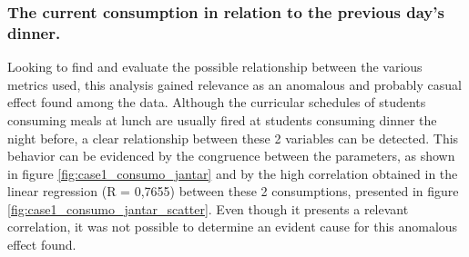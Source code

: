                 \subsubsection{The current consumption in relation to the previous day's dinner.}
                
                Looking to find and evaluate the possible relationship between the various metrics used, this analysis gained relevance as an anomalous and probably casual effect found among the data.
                Although the curricular schedules of students consuming meals at lunch are usually fired at students consuming dinner the night before, a clear relationship between these 2 variables can be detected.
                 This behavior can be evidenced by the congruence between the parameters, as shown in figure \ref{fig:case1_consumo_jantar} and by the high correlation obtained in the linear regression (R = 0,7655) between these 2 consumptions, presented in figure  \ref{fig:case1_consumo_jantar_scatter}. Even though it presents a relevant correlation, it was not possible to determine an evident cause for this anomalous effect found.

                
  
                \begin{figure}[H]
                \end{figure} 
               
